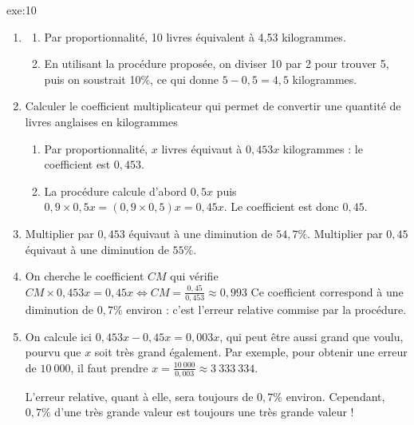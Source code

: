 {}{exe:10}{
	\begin{enumerate}
		\item 
			\begin{enumerate}[label=(\alph*)]
				\item
				Par proportionnalité, 10 livres équivalent à 4,53 kilogrammes.
				\item 
				En utilisant la procédure proposée, on diviser 10 par 2 pour trouver 5, puis on soustrait 10\%, ce qui donne $5-0,5 = 4,5$ kilogrammes.
			\end{enumerate}
		\item 
		Calculer le coefficient multiplicateur qui permet de convertir une quantité de livres anglaises en kilogrammes
			\begin{enumerate}[label=(\alph*)]
				\item 
				Par proportionnalité, $x$ livres équivaut à $0,453x$ kilogrammes : le coefficient est $0,453$.
				\item
				La procédure calcule d'abord $0,5x$ puis $0,9 \times 0,5 x = (0,9 \times 0,5) x = 0,45x$.
				Le coefficient est donc $0,45$.
			\end{enumerate}
		\item
		Multiplier par $0,453$ équivaut à une diminution de $54,7\%$.
		Multiplier par $0,45$ équivaut à une diminution de $55\%$.
		\item
		On cherche le coefficient $CM$ qui vérifie $CM \times 0,453x = 0,45x \iff CM = \frac{0,45}{0,453} \approx 0,993$
		Ce coefficient correspond à une diminution de $0,7\%$ environ : c'est l'erreur relative commise par la procédure.
		\item
		On calcule ici $0,453x - 0,45x = 0,003x$, qui peut être aussi grand que voulu, pourvu que $x$ soit très grand également.
		Par exemple, pour obtenir une erreur de $10~000$, il faut prendre $x=\frac{10~000}{0,003} \approx 3~333~334$.
		
		L'erreur relative, quant à elle, sera toujours de $0,7\%$ environ.
		Cependant, $0,7\%$ d'une très grande valeur est toujours une très grande valeur !
	\end{enumerate}
}


\newpage
{}
\shipoutAnswer




